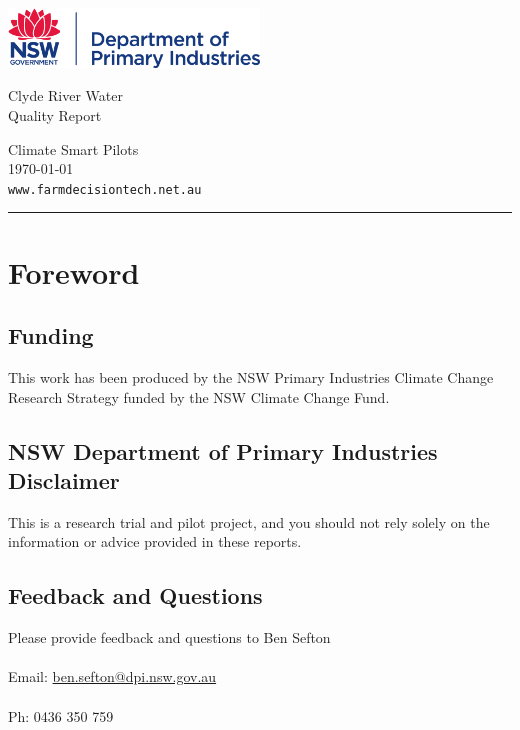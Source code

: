 \documentclass[10pt]{article}
\begin{document}
\begin{titlepage}
		\parbox[t]{0.93\textwidth}{
			\parbox[t]{0.91\textwidth}{
				\raggedright
				\fontsize{50pt}{80pt}\selectfont
				\vspace{0.7cm}
				\includegraphics[width=0.5\textwidth]{DPI_logo.png}
				
				Clyde River Water\\
				Quality Report\\
				\vspace{0.7cm}
			}
		}
	\vfill
	\parbox[t]{0.93\textwidth}{ 
		\raggedleft
		\large
		{\Large Climate Smart Pilots}\\[4pt] 
		\today \\
		\vspace{0.5cm}
		\texttt{www.farmdecisiontech.net.au}\\
		
		\hfill\rule{0.2\linewidth}{1pt}
	}
\end{titlepage}

\section*{Foreword}

\subsection*{Funding}
This work has been produced by the NSW Primary Industries Climate Change Research Strategy funded by the NSW Climate Change Fund.

\subsection*{NSW Department of Primary Industries Disclaimer}
This is a research trial and pilot project, and you should not rely solely on the information or advice provided in these reports.

\subsection*{Feedback and Questions}
Please provide feedback and questions to Ben Sefton \\ \\
Email: \href{mailto:ben.sefton@dpi.nsw.gov.au}{ben.sefton@dpi.nsw.gov.au} \\ \\
Ph: 0436 350 759
\end{document}

